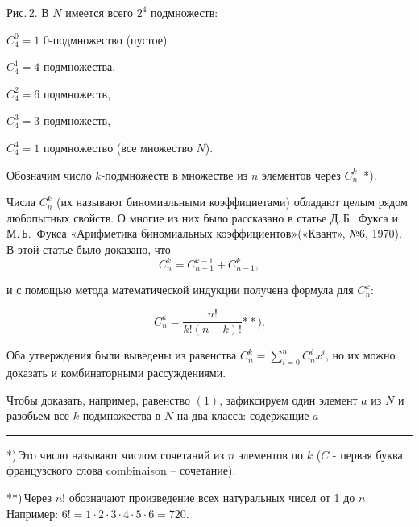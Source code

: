\fancyfoot[LE]{\footnotesize\thepage}
\fancyfoot[RO]{\footnotesize\thepage}
\twocolumn
\begin{footnotesize}
\noindent Рис.\,2. В $N$ имеется всего $2^4$ подмножеств:

\noindent$C^0_4 = 1$ 0-подмножество (пустое)
 
\vspace{4mm}
\noindent $C^1_4 = 4$ подмножества,

\vspace{10mm}
\noindent $C^2_4 = 6$  подмножеств,

\vspace{13mm}
\noindent $C^3_4 = 3$ подмножеств,

\vspace{10mm}
\noindent $C^4_4 = 1$ подмножество (все множество $N$).
\end{footnotesize}
\vspace{5mm}

Обозначим число $k$-подмножеств в множестве из $n$ элементов через $C^k_n$~*).

Числа $C^k_n$ (их называют биномиальными коэффициетами) обладают целым рядом любопытных свойств. О многие из них было рассказано в статье Д.\,Б.~Фукса и М.\,Б.~Фукса «Арифметика биномиальных коэффициентов»(«Квант», №6, 1970). В этой статье было доказано, что 
\begin{equation}
	C^k_n = C^{k-1}_{n-1} + C^k_{n-1},
\end{equation}

\noindent и с помощью метода математической индукции получена формула для $C^k_n$:

\begin{equation}
	C^k_n = \frac{n!}{k!(n - k)!}{\ast\ast}).
\end{equation}

Оба утверждения были выведены из равенства $ C^k_n = \sum^{n}_{i=0}C^i_nx^i $, но их можно доказать и комбинаторными рассуждениями.

Чтобы доказать, например, равенство $ (1) $, зафиксируем один элемент $a$ из $ N $ и разобьем все $ k $-подмножества в $ N $ на два класса: содержащие $a$

\noindent\rule{1.8cm}{1px}
\vspace{2mm}

\begin{footnotesize}
*)\,Это число называют числом сочетаний из $ n $ элементов по $ k $ ($ C $ - первая буква французского слова combinaison -- сочетание).

**)\,Через $n!$ обозначают произведение всех натуральных чисел от 1 до $ n $. Например: $ 6!= 1\cdot2\cdot3\cdot4\cdot5\cdot6=720. $
\end{footnotesize}

